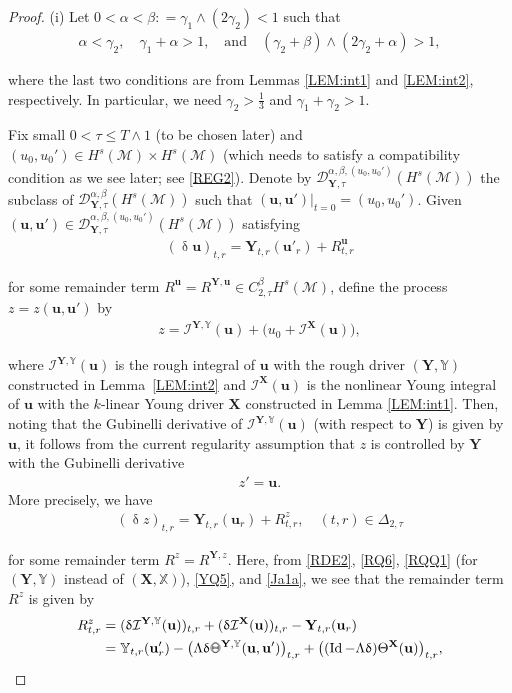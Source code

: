 \documentclass[letterpaper, 11pt,  reqno]{amsart}
\DeclareMathOperator{\Id}{Id}
\newcommand{\1}{\hspace{0.5mm}\textup{I}\hspace{0.5mm}}
\newcommand{\I}{\mathcal{I}}
\newcommand{\noi}{\noindent}
\newcommand{\D}{\mathcal{D}}
\newcommand{\al}{\alpha}
\newcommand{\be}{\beta}
\newcommand{\updl}{\updelta}
\newcommand{\Dl}{\Delta}
\newcommand{\g}{\gamma}
\newcommand{\Ld}{\Lambda}
\newcommand{\M}{\mathcal{M}}
\newcommand{\uu}{\mathbf{u}}
\newcommand{\Ta}{\Theta}
\newcommand{\XXb}{\mathbb{X}}
\newcommand{\YYb}{\mathbb{Y}}
\newcommand{\XX}{\mathbf{X}}
\newcommand{\YY}{\mathbf{Y}}
\def\doublestroke#1{\pdfliteral{1 Tr .35 w}#1\pdfliteral{0 Tr 0 w}}
\newcommand{\Taa}{\doublestroke{\Theta}}
\numberwithin{equation}{section}
\numberwithin{theorem}{section}
\begin{document}
\begin{proof}


(i)
Let $0 < \al < \be : = \g_1\wedge (2\g_2) < 1$ such that 
\begin{align}
\al < \g_2, \quad 
 \g_1+\al > 1, 
\quad \text{and}\quad 
 (\g_2 + \be)\wedge (2\g_2 + \al) > 1, 
\label{REG1}
\end{align}



\noi
where the last two conditions are from Lemmas \ref{LEM:int1}
and \ref{LEM:int2}, respectively.
In particular, 
we need $\g_2 > \frac 13$ and $\g_1 + \g_2 > 1$.
	
Fix small $0 < \tau \le T\wedge 1$ (to be chosen later)
and $(u_0, u_0') \in H^s(\M) \times H^s(\M)$
(which needs to  satisfy a compatibility condition as we see later; see \eqref{REG2}).
Denote by $\D^{\al, \be, (u_0, u_0')}_{\YY, \tau}(H^s(\M))$
the subclass of 
$\D^{\al, \be}_{\YY, \tau}(H^s(\M))$
such that 
$(\uu, \uu')|_{t = 0} = (u_0, u_0')$.
Given $(\uu, \uu') \in \D^{\al, \be, (u_0, u_0')}_{\YY, \tau}(H^s(\M))$
satisfying 
\begin{align}
(\updl \uu)_{t, r} = \YY_{t, r}(\uu'_r) + R^\uu_{t, r}
\label{RDE1a}
\end{align}


\noi
for some remainder term 
$R^\uu = R^{\YY, \uu}\in   C^{\be}_{2, \tau}H^s(\M)$, 
define the  process 
 $z = z(\uu, \uu')$ by 
\begin{align}
z
  = \I^{\YY, \YYb}(\uu)
+ \big(u_0 + \I^\XX(\uu)\big), 
\label{RDE2}
\end{align}

\noi
where
$\I^{\YY, \YYb}(\uu)$ is the rough integral of $\uu$
with the rough driver $(\YY, \YYb)$ constructed in Lemma~\ref{LEM:int2}
and   $\I^\XX(\uu)$ is the nonlinear Young integral of $\uu$
with the $k$-linear Young driver $\XX$ constructed in Lemma \ref{LEM:int1}.
Then, 
noting that the Gubinelli derivative of $\I^{\YY, \YYb}(\uu)$
(with respect to $\YY$)
is given by $\uu$, 
it follows from 
 the current regularity assumption
 that $z$ is controlled by $\YY$ with the Gubinelli derivative 
 \begin{align}
 z' = \uu.
 \label{RDE2a}
 \end{align}
 More precisely, we have
\begin{align}
(\updl z)_{t, r}
= \YY_{t, r} (\uu_r) + R^z_{t, r}, \quad (t, r) \in \Dl_{2, \tau}
\label{RDE3} 
\end{align}

\noi
for some remainder term $R^z = R^{\YY, z}$.
Here, 
from \eqref{RDE2}, 
\eqref{RQ6},  \eqref{RQQ1}
(for $(\YY, \YYb)$ instead of $(\XX, \XXb)$), 
\eqref{YQ5}, and \eqref{Ja1a}, 
we see that the remainder term
 $R^z$ is given by 
\begin{align}
\begin{split}
R^z_{t, r} 
& = (\updl \I^{\YY, \YYb}(\uu))_{t, r}
+ (\updl\I^\XX(\uu))_{t, r} - \YY_{t, r} (\uu_r)\\
& = 
\YYb_{t, r} (\uu_r')
- \big(\Ld \updl
\Taa^{\YY, \YYb}(\uu, \uu')\big)_{t, r}
+ \big((\Id - \Ld \updl) \Ta^\XX(\uu)\big)_{t, r},
\end{split}
\label{RDE4}
\end{align}


\end{proof}
\end{document}
